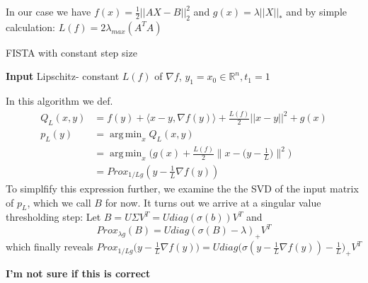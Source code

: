 \documentclass{article}
\DeclareMathOperator*{\argmin}{arg\,min}
\begin{document}
In our case we have $f(x) = \frac{1}{2} ||AX - B||_2^2$ and $g(x) =  \lambda||X||_*$ and by simple calculation: $L(f) = 2\lambda_{max}(A^TA)$
\begin{algorithm}[H]
\caption{FISTA with constant step size}
\hspace*{\algorithmicindent} \textbf{Input} Lipschitz- constant $L(f)$ of $\nabla f$, $y_1 = x_0 \in \mathbb{R}^n, t_1=1$
\begin{algorithmic}[1]
\EndFor
\end{algorithmic}
\end{algorithm}


In this algorithm we def. 
\begin{align*}
Q_L(x,y) &= f(y) + \langle x-y, \nabla f(y) \rangle + \frac{L(f)}{2} ||x-y||^2 + g(x)\\
p_L(y) &= \argmin_x Q_L(x,y)\\
&= \argmin_x \Big( g(x) + \frac{L(f)}{2} \Big\| x - \Big( y - \frac{1}{L}\Big)\Big\|^2 \Big)\\
&= Prox_{1/L g}(y - \frac{1}{L}\nabla f(y))
\end{align*}
To simplfify this expression further, we examine the the SVD of the input matrix of $p_L$, which we call $B$ for now. It turns out we arrive at a singular value thresholding step: Let $B = U \Sigma V^T = U diag(\sigma(b)) V^T$ and
$$Prox_{\lambda g}(B) = U diag(\sigma(B) - \lambda)_+ V^T$$
which finally reveals $Prox_{1/L g} \Big(y - \frac{1}{L} \nabla f(y) \Big) = U diag \Big(\sigma(y - \frac{1}{L} \nabla f(y)) - \frac{1}{L}\Big)_+ V^T$


\textbf{I'm not sure if this is correct}
\end{document}
